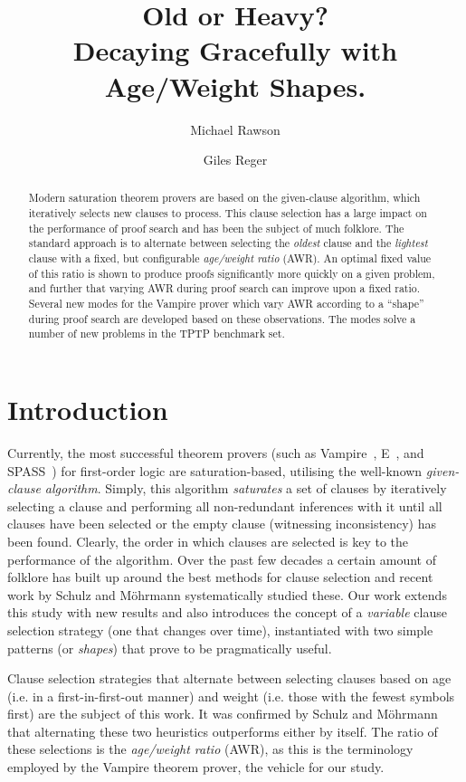 \documentclass{llncs}
\title{Old or Heavy?\\Decaying Gracefully with Age/Weight Shapes.}
\author{Michael Rawson \and Giles Reger}
\institute{University of Manchester, Manchester, UK}
\newcommand{\sandm}{Schulz and M{\"{o}}hrmann}
\begin{document}
\maketitle
\begin{abstract}
Modern saturation theorem provers are based on the given-clause algorithm, which iteratively selects new clauses to process. This clause selection has a large impact on the performance of proof search and has been the subject of much folklore.  
The standard approach is to alternate between selecting the \emph{oldest} clause and the \emph{lightest} clause with a fixed, but configurable \emph{age/weight ratio} (AWR).
An optimal fixed value of this ratio is shown to produce proofs significantly more quickly on a given problem, and further that varying AWR during proof search can improve upon a fixed ratio.
Several new modes for the Vampire prover which vary AWR according to a ``shape'' during proof search are developed based on these observations.
The modes solve a number of new problems in the TPTP benchmark set.
\end{abstract}

\section{Introduction}
\label{sec:introduction}

Currently, the most successful theorem provers (such as Vampire~\cite{vampire}, E~\cite{E}, and SPASS~\cite{Spass}) for first-order logic are saturation-based, utilising the well-known \emph{given-clause algorithm}.
Simply, this algorithm \emph{saturates} a set of clauses by iteratively selecting a clause and performing all non-redundant inferences with it until all clauses have been selected or the empty clause (witnessing inconsistency) has been found.
Clearly, the order in which clauses are selected is key to the performance of the algorithm.
Over the past few decades a certain amount of folklore has built up around the best methods for clause selection and recent work by \sandm{} \cite{clause-selection-heuristics} systematically studied these.
Our work extends this study with new results and also introduces the concept of a \emph{variable} clause selection strategy (one that changes over time), instantiated with two simple patterns (or \emph{shapes}) that prove to be pragmatically useful.

Clause selection strategies that alternate between selecting clauses based on age (i.e. in a first-in-first-out manner) and weight (i.e. those with the fewest symbols first) are the subject of this work.
It was confirmed by \sandm{} that alternating these two heuristics outperforms either by itself.
The ratio of these selections is the \emph{age/weight ratio} (AWR), as this is the terminology employed by the Vampire theorem prover, the vehicle for our study.
\end{document}
